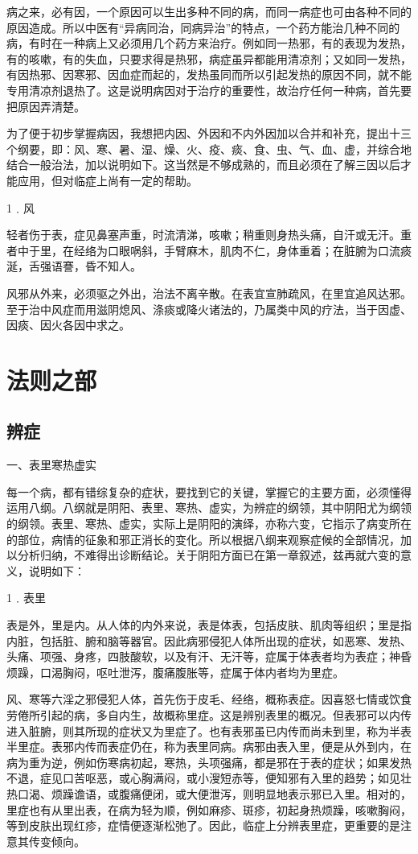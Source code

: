 \documentclass[a4paper,12pt,UTF8,twoside]{ctexbook}
\begin{document}
病之来，必有因，一个原因可以生出多种不同的病，而同一病症也可由各种不同的原因造成。所以中医有“异病同治，同病异治”的特点，一个药方能治几种不同的病，有时在一种病上又必须用几个药方来治疗。例如同一热邪，有的表现为发热，有的咳嗽，有的失血，只要求得是热邪，病症虽异都能用清凉剂；又如同一发热，有因热邪、因寒邪、因血症而起的，发热虽同而所以引起发热的原因不同，就不能专用清凉剂退热了。这是说明病因对于治疗的重要性，故治疗任何一种病，首先要把原因弄清楚。

为了便于初步掌握病因，我想把内因、外因和不内外因加以合并和补充，提出十三个纲要，即：风、寒、暑、湿、燥、火、疫、痰、食、虫、气、血、虚，并综合地结合一般治法，加以说明如下。这当然是不够成熟的，而且必须在了解三因以后才能应用，但对临症上尚有一定的帮助。

1﹒风

轻者伤于表，症见鼻塞声重，时流清涕，咳嗽；稍重则身热头痛，自汗或无汗。重者中于里，在经络为口眼㖞斜，手臂麻木，肌肉不仁，身体重着；在脏腑为口流痰涎，舌强语謇，昏不知人。

风邪从外来，必须驱之外出，治法不离辛散。在表宜宣肺疏风，在里宜追风达邪。至于治中风症而用滋阴熄风、涤痰或降火诸法的，乃属类中风的疗法，当于因虚、因痰、因火各因中求之。

\chapter{法则之部}

\section{辨症}

一、表里寒热虚实

每一个病，都有错综复杂的症状，要找到它的关键，掌握它的主要方面，必须懂得运用八纲。八纲就是阴阳、表里、寒热、虚实，为辨症的纲领，其中阴阳尤为纲领的纲领。表里、寒热、虚实，实际上是阴阳的演绎，亦称六变，它指示了病变所在的部位，病情的征象和邪正消长的变化。所以根据八纲来观察症候的全部情况，加以分析归纳，不难得出诊断结论。关于阴阳方面已在第一章叙述，兹再就六变的意义，说明如下：

1﹒表里

表是外，里是内。从人体的内外来说，表是体表，包括皮肤、肌肉等组织；里是指内脏，包括脏、腑和脑等器官。因此病邪侵犯人体所出现的症状，如恶寒、发热、头痛、项强、身疼，四肢酸软，以及有汗、无汗等，症属于体表者均为表症；神昏烦躁，口渴胸闷，呕吐泄泻，腹痛腹胀等，症属于体内者均为里症。

风、寒等六淫之邪侵犯人体，首先伤于皮毛、经络，概称表症。因喜怒七情或饮食劳倦所引起的病，多自内生，故概称里症。这是辨别表里的概况。但表邪可以内传进入脏腑，则其所现的症状又为里症了。也有表邪虽已内传而尚未到里，称为半表半里症。表邪内传而表症仍在，称为表里同病。病邪由表入里，便是从外到内，在病为重为逆，例如伤寒病初起，寒热，头项强痛，都是邪在于表的症状；如果发热不退，症见口苦呕恶，或心胸满闷，或小溲短赤等，便知邪有入里的趋势；如见壮热口渴、烦躁谵语，或腹痛便闭，或大便泄泻，则明显地表示邪已入里。相对的，里症也有从里出表，在病为轻为顺，例如麻疹、斑疹，初起身热烦躁，咳嗽胸闷，等到皮肤出现红疹，症情便逐渐松弛了。因此，临症上分辨表里症，更重要的是注意其传变倾向。
\end{document}
